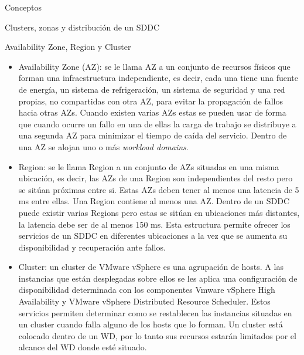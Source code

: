 \begin{section}{Conceptos}
\begin{subsection}{Clusters, zonas y distribución de un SDDC}
\begin{subsubsection}{Availability Zone, Region y Cluster}
\begin{itemize}
  \item Availability Zone (AZ): se le llama AZ a un conjunto de recursos físicos que forman una infraestructura independiente, es decir, cada una tiene una fuente de energía, un sistema de refrigeración, un sistema de seguridad y una red propias, no compartidas con otra AZ, para evitar la propagación de fallos hacia otras AZs. Cuando existen varias AZs estas se pueden usar de forma que cuando ocurre un fallo en una de ellas la carga de trabajo se distribuye a una segunda AZ para minimizar el tiempo de caída del servicio. Dentro de una AZ se alojan uno o más \textit{workload domains}.
  
  \item Region: se le llama Region a un conjunto de AZs situadas en una misma ubicación, es decir, las AZs de una Region son independientes del resto pero se sitúan próximas entre si. Estas AZs deben tener al menos una latencia de 5 ms entre ellas. Una Region contiene al menos una AZ. Dentro de un SDDC puede existir varias Regions pero estas se sitúan en ubicaciones más distantes, la latencia debe ser de al menos 150 ms. Esta estructura permite ofrecer los servicios de un SDDC en diferentes ubicaciones a la vez que se aumenta su disponibilidad y recuperación ante fallos.
  
  \item Cluster: un cluster de VMware vSphere es una agrupación de hosts. A las instancias que están desplegadas sobre ellos se les aplica una configuración de disponibilidad determinada con los componentes Vmware vSphere High Availability y VMware vSphere Distributed Resource Scheduler. Estos servicios permiten determinar como se restablecen las instancias situadas en un cluster cuando falla alguno de los hosts que lo forman. Un cluster está colocado dentro de un WD, por lo tanto sus recursos estarán limitados por el alcance del WD donde esté situado. 
\end{itemize} 


\end{subsubsection}
\end{subsection}
\end{section}
